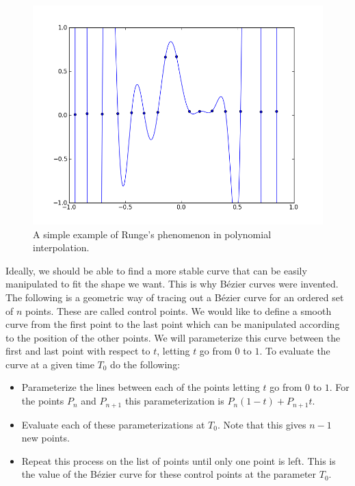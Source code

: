 \begin{figure}
\includegraphics[width=.9\textwidth]{bad_interpolation2}
\caption{A simple example of Runge's phenomenon in polynomial interpolation.}
\label{bezier:bad_interpolation2}
\end{figure}

Ideally, we should be able to find a more stable curve that can be easily manipulated to fit the shape we want.
This is why B\'{e}zier curves were invented.
The following is a geometric way of tracing out a B\'{e}zier curve for an ordered set of $n$ points.
These are called control points.
We would like to define a smooth curve from the first point to the last point which can be manipulated according to the position of the other points.
We will parameterize this curve between the first and last point with respect to $t$, letting $t$ go from $0$ to $1$.
To evaluate the curve at a given time $T_0$ do the following:
\begin{itemize}

\item

Parameterize the lines between each of the points letting $t$ go from $0$ to $1$.
For the points $P_{n}$ and $P_{n+1}$ this parameterization is $P_{n} (1-t) + P_{n+1} t$.

\item

Evaluate each of these parameterizations at $T_0$.
Note that this gives $n-1$ new points.

\item

Repeat this process on the list of points until only one point is left.
This is the value of the B\'{e}zier curve for these control points at the parameter $T_0$.

\end{itemize}

